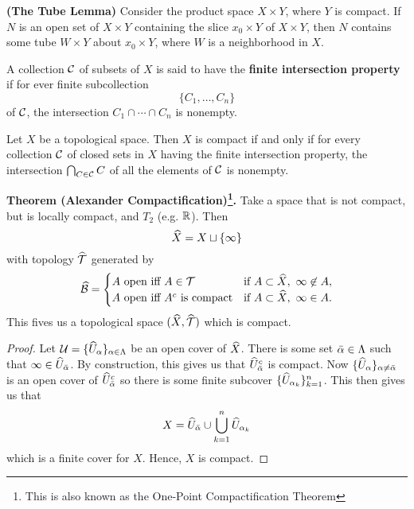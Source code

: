 \vs

\begin{lem}\textbf{(The Tube Lemma)}
Consider the product space $X\times Y$, where $Y$ is compact. If $N$ is an open set of $X\times Y$ containing the slice $x_0\times Y$ of $X\times Y$, then $N$ contains some tube $W\times Y$ about $x_0\times Y$, where $W$ is a neighborhood in $X$.
\end{lem}

\dfn A collection $\mathcal{C}$ of subsets of $X$ is said to have the \textbf{finite intersection property} if for ever finite subcollection
\[\{C_1, \ldots, C_n\}\]
of $\mathcal{C}$, the intersection $C_1\cap \cdots\cap C_n$ is nonempty.

\vs

\begin{thm}
Let $X$ be a topological space. Then $X$ is compact if and only if for every collection $\mathcal{C}$ of closed sets in $X$ having the finite intersection property, the intersection $\bigcap_{C\in\mathcal{C}}C$ of all the elements of $\mathcal{C}$ is nonempty.
\end{thm}


\textbf{Theorem (Alexander Compactification)\footnote{This is also known as the One-Point Compactification Theorem}.}  Take a space that is not compact, but is locally compact, and $T_2$ (e.g. $\mathbb{R}$). Then
\[\widehat X = X\sqcup \{\infty\}\]
with topology $\widehat {\mathcal{T}}$ generated by
\[\widehat{\mathcal{B}} = \begin{cases}
A\text{ open iff $A\in \mathcal{T}$} & \text{if } A \subset \widehat X,\  \infty \not\in A,\\
A\text{ open iff $A^c$ is compact} & \text{if } A \subset \widehat X,\  \infty \in A.
\end{cases}\]
This fives us a topological space $(\widehat X,\widehat {\mathcal{T}})$ which is compact.

\begin{proof}
Let $\mathcal{U} = \{\widehat U_\alpha\}_{\alpha \in \Lambda}$ be an open cover of $\widehat X$. There is some set $\bar {\alpha} \in \Lambda$ such that $\infty \in \widehat U_{\bar {\alpha}}$. By construction, this gives us that $\widehat U_{\bar {\alpha}}^c$ is compact. Now $\{\widehat U_\alpha\}_{\alpha \neq \bar {\alpha}}$ is an open cover of $\widehat U_{\bar {\alpha}}^c$ so there is some finite subcover $\{\widehat U_{\alpha_k}\}_{k = 1}^n$. This then gives us that
\[X = \widehat U_{\bar {\alpha}} \cup \bigcup_{k = 1}^n \widehat U_{\alpha_k}\]
which is a finite cover for $X$. Hence, $X$ is compact.
\end{proof}




